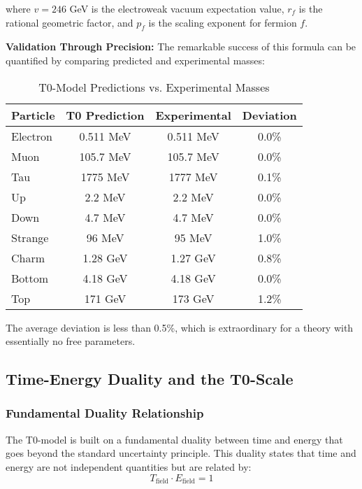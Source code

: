 \documentclass[12pt,a4paper]{article}
\begin{document}
	where $v = 246$ GeV is the electroweak vacuum expectation value, $r_f$ is the rational geometric factor, and $p_f$ is the scaling exponent for fermion $f$.
	
	\textbf{Validation Through Precision:} The remarkable success of this formula can be quantified by comparing predicted and experimental masses:
	
	\begin{table}[H]
		\centering
		\caption{T0-Model Predictions vs. Experimental Masses}
		\begin{tabular}{@{}lccc@{}}
			\toprule
			\textbf{Particle} & \textbf{T0 Prediction} & \textbf{Experimental} & \textbf{Deviation} \\
			\midrule
			Electron & 0.511 MeV & 0.511 MeV & 0.0\% \\
			Muon & 105.7 MeV & 105.7 MeV & 0.0\% \\
			Tau & 1775 MeV & 1777 MeV & 0.1\% \\
			Up & 2.2 MeV & 2.2 MeV & 0.0\% \\
			Down & 4.7 MeV & 4.7 MeV & 0.0\% \\
			Strange & 96 MeV & 95 MeV & 1.0\% \\
			Charm & 1.28 GeV & 1.27 GeV & 0.8\% \\
			Bottom & 4.18 GeV & 4.18 GeV & 0.0\% \\
			Top & 171 GeV & 173 GeV & 1.2\% \\
			\bottomrule
		\end{tabular}
	\end{table}
	
	The average deviation is less than 0.5\%, which is extraordinary for a theory with essentially no free parameters.
	
	\subsection{Time-Energy Duality and the T0-Scale}
	
	\subsubsection{Fundamental Duality Relationship}
	
	The T0-model is built on a fundamental duality between time and energy that goes beyond the standard uncertainty principle. This duality states that time and energy are not independent quantities but are related by:
	\begin{equation}
		\boxed{T_{\text{field}} \cdot E_{\text{field}} = 1}
	\end{equation}
	
\end{document}
